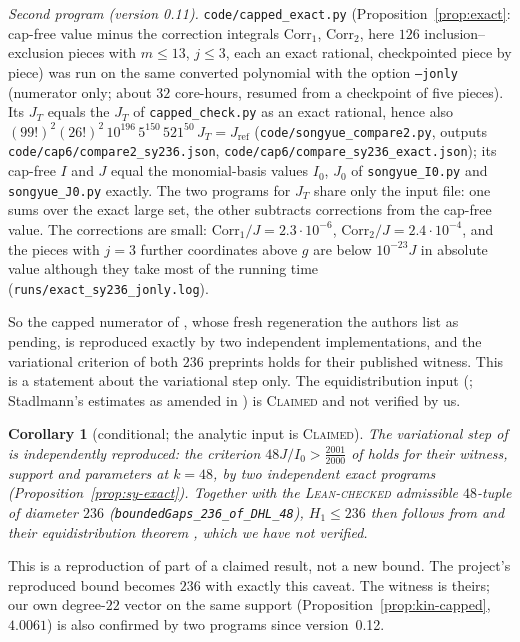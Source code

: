 \documentclass[11pt]{amsart}
\newtheorem{corollary}[theorem]{Corollary}
\theoremstyle{definition}
\theoremstyle{remark}
\newcommand{\lbl}[1]{\textup{\textsc{#1}}}
\begin{document}
\begin{sloppypar}
\emph{Second program (version 0.11).} \texttt{code/capped\_exact.py}
(Proposition~\ref{prop:exact}: cap-free value minus the correction integrals
$\mathrm{Corr}_1$, $\mathrm{Corr}_2$, here $126$ inclusion--exclusion pieces
with $m\le13$, $j\le3$, each an exact rational, checkpointed piece by piece)
was run on the same converted polynomial with the option \texttt{--jonly}
(numerator only; about $32$ core-hours, resumed from a checkpoint of five pieces). Its $J_T$ equals the $J_T$ of
\texttt{capped\_check.py} as an exact rational, hence also
$(99!)^2(26!)^2\,10^{196}\,5^{150}\,521^{50}\,J_T=J_{\mathrm{ref}}$
(\texttt{code/songyue\_compare2.py}, outputs
\texttt{code/cap6/compare2\_sy236.json}, \texttt{code/cap6/compare\_sy236\_exact.json});
its cap-free $I$ and $J$ equal the monomial-basis values $I_0$, $J_0$ of
\texttt{songyue\_I0.py} and \texttt{songyue\_J0.py} exactly. The two
programs for $J_T$ share only the input file: one sums over the exact large
set, the other subtracts corrections from the cap-free value. The
corrections are small: $\mathrm{Corr}_1/J=2.3\cdot10^{-6}$,
$\mathrm{Corr}_{2}/J=2.4\cdot10^{-4}$, and the pieces with $j=3$ further
coordinates above $g$ are below $10^{-23}J$ in absolute value although they
take most of the running time (\texttt{runs/exact\_sy236\_jonly.log}).
\end{sloppypar}
So the capped numerator of \cite{SY26}, whose fresh regeneration the authors
list as pending, is reproduced exactly by two independent implementations, and
the variational criterion of both $236$ preprints holds for their published
witness. This is a statement about the variational step only. The
equidistribution input (\cite[Theorem~4.18]{SY26}; Stadlmann's estimates as
amended in \cite{Kin26}) is \lbl{Claimed} and not verified by us.

\begin{corollary}[conditional; the analytic input is \lbl{Claimed}]\label{cor:236}
The variational step of \cite{SY26} is independently reproduced: the
criterion $48J/I_0>\frac{2001}{2000}$ of \cite[Prop.~4.21]{SY26} holds for
their witness, support and parameters at $k=48$, by two independent exact
programs (Proposition~\ref{prop:sy-exact}). Together with the
\lbl{Lean-checked} admissible $48$-tuple of diameter $236$
(\texttt{boundedGaps\_236\_of\_DHL\_48}), $H_1\le236$ then follows from
\cite[Theorem~4.33]{SY26} and their equidistribution theorem
\cite[Theorem~4.18]{SY26}, which we have not verified.
\end{corollary}
This is a reproduction of part of a claimed result, not a new bound. The
project's reproduced bound becomes $236$ with exactly this caveat. The
witness is theirs; our own degree-$22$ vector on the same support
(Proposition~\ref{prop:kin-capped}, $4.0061$) is also confirmed by two
programs since version~0.12.
\end{document}
